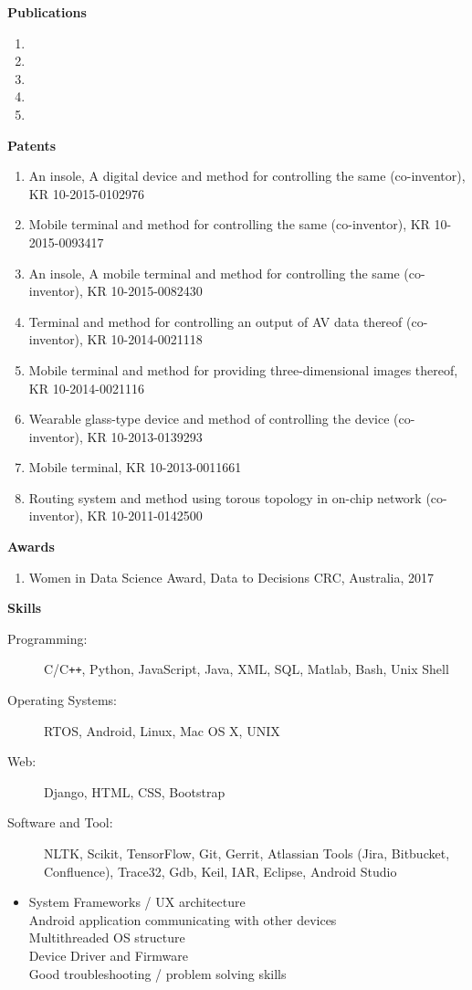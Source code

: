 \documentclass[letterpaper,11pt]{article}
\newcommand{\resheading}[1]{{\large \colorbox{mygrey}{\begin{minipage}{\textwidth}{\textbf{#1 \vphantom{p\^{E}}}}\end{minipage}}}}
\begin{document}
\pagebreak



\resheading{Publications}
    \begin{enumerate}
        \item {}
        \item {}
        \item {}
        \item {}
        \item {}
    \end{enumerate}


\resheading{Patents}
    \begin{enumerate}
        \item An insole, A digital device and method for controlling the same (co-inventor), KR 10-2015-0102976
        \item Mobile terminal and method for controlling the same (co-inventor), KR 10-2015-0093417
        \item An insole, A mobile terminal and method for controlling the same (co-inventor), KR 10-2015-0082430
        \item Terminal and method for controlling an output of AV data thereof (co-inventor), KR 10-2014-0021118
        \item Mobile terminal and method for providing three-dimensional images thereof, KR 10-2014-0021116
        \item Wearable glass-type device and method of controlling the device (co-inventor), KR 10-2013-0139293
        \item Mobile terminal, KR 10-2013-0011661
        \item Routing system and method using torous topology in on-chip network (co-inventor), KR 10-2011-0142500
    \end{enumerate}

\resheading{Awards}
    \begin{enumerate}
        \item Women in Data Science Award, Data to Decisions CRC, Australia, 2017
    \end{enumerate}

\resheading{Skills}

\begin{description}
    \item[Programming:] C/C{}\verb!++!, Python, JavaScript, Java, XML, SQL, Matlab, Bash, Unix Shell
    \item[Operating Systems:] RTOS, Android, Linux, Mac OS X, {\sc UNIX}
    \item[Web:] Django, HTML, CSS, Bootstrap
    \item[Software and Tool:] NLTK, Scikit, TensorFlow, Git, Gerrit, Atlassian Tools (Jira, Bitbucket, Confluence), Trace32, Gdb, Keil, IAR, Eclipse, Android Studio
\end{description}

\begin{itemize}
    \item[] System Frameworks / UX architecture\\
    Android application communicating with other devices\\
    Multithreaded OS structure\\
    Device Driver and Firmware\\
    Good troubleshooting / problem solving skills\\
\end{itemize}
\end{document}
